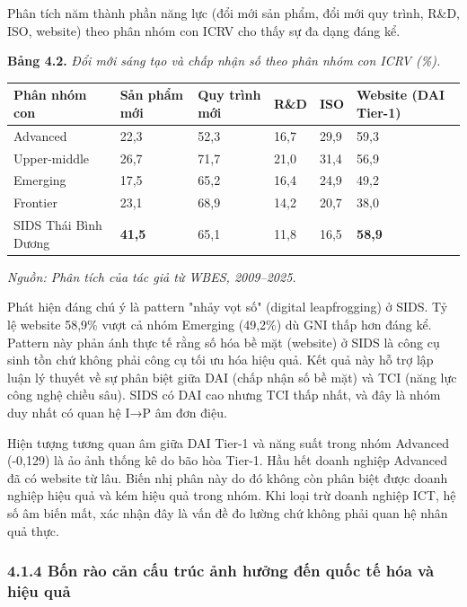\documentclass[12pt,a4paper]{article}
\begin{document}
Phân tích năm thành phần năng lực (đổi mới sản phẩm, đổi mới quy trình,
R\&D, ISO, website) theo phân nhóm con ICRV cho thấy sự đa dạng đáng kể.

\textbf{Bảng 4.2.} \emph{Đổi mới sáng tạo và chấp nhận số theo phân nhóm
con ICRV (\%).}

\begin{longtable}[]{@{}llllll@{}}
\toprule\noalign{}
Phân nhóm con & Sản phẩm mới & Quy trình mới & R\&D & ISO & Website (DAI
Tier-1) \\
\midrule\noalign{}
\endhead
\bottomrule\noalign{}
\endlastfoot
Advanced & 22,3 & 52,3 & 16,7 & 29,9 & 59,3 \\
Upper-middle & 26,7 & 71,7 & 21,0 & 31,4 & 56,9 \\
Emerging & 17,5 & 65,2 & 16,4 & 24,9 & 49,2 \\
Frontier & 23,1 & 68,9 & 14,2 & 20,7 & 38,0 \\
SIDS Thái Bình Dương & \textbf{41,5} & 65,1 & 11,8 & 16,5 &
\textbf{58,9} \\
\end{longtable}

\emph{Nguồn: Phân tích của tác giả từ WBES, 2009--2025.}

Phát hiện đáng chú ý là pattern "nhảy vọt số" (digital leapfrogging) ở
SIDS. Tỷ lệ website 58,9\% vượt cả nhóm Emerging (49,2\%) dù GNI thấp
hơn đáng kể. Pattern này phản ánh thực tế rằng số hóa bề mặt (website) ở
SIDS là công cụ sinh tồn chứ không phải công cụ tối ưu hóa hiệu quả. Kết
quả này hỗ trợ lập luận lý thuyết về sự phân biệt giữa DAI (chấp nhận số
bề mặt) và TCI (năng lực công nghệ chiều sâu). SIDS có DAI cao nhưng TCI
thấp nhất, và đây là nhóm duy nhất có quan hệ I→P âm đơn điệu.

Hiện tượng tương quan âm giữa DAI Tier-1 và năng suất trong nhóm
Advanced (-0,129) là ảo ảnh thống kê do bão hòa Tier-1. Hầu hết doanh
nghiệp Advanced đã có website từ lâu. Biến nhị phân này do đó không còn
phân biệt được doanh nghiệp hiệu quả và kém hiệu quả trong nhóm. Khi
loại trừ doanh nghiệp ICT, hệ số âm biến mất, xác nhận đây là vấn đề đo
lường chứ không phải quan hệ nhân quả thực.

\hypertarget{414-bux1ed1n-ruxe0o-cux1ea3n-cux1ea5u-truxfac-ux1ea3nh-hux1b0ux1edfng-ux111ux1ebfn-quux1ed1c-tux1ebf-huxf3a-vuxe0-hiux1ec7u-quux1ea3}{%
\subsubsection{4.1.4 Bốn rào cản cấu trúc ảnh hưởng đến quốc tế hóa và
hiệu
quả}\label{414-bux1ed1n-ruxe0o-cux1ea3n-cux1ea5u-truxfac-ux1ea3nh-hux1b0ux1edfng-ux111ux1ebfn-quux1ed1c-tux1ebf-huxf3a-vuxe0-hiux1ec7u-quux1ea3}}
\end{document}
